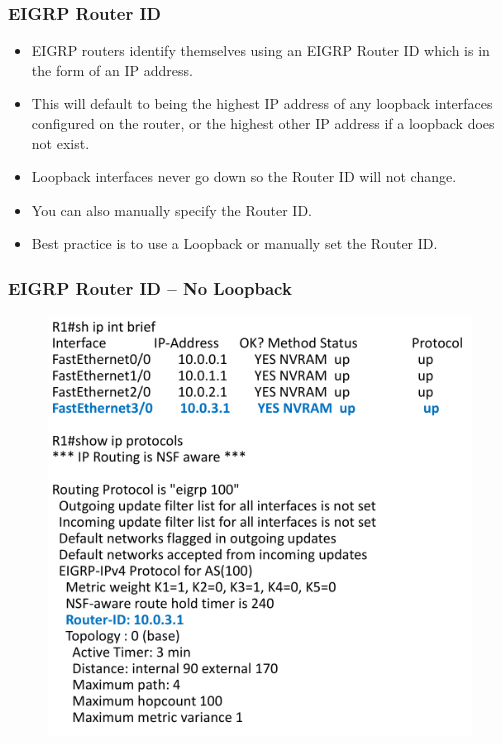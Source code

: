 \documentclass[pdflatex,compress,mathserif]{beamer}
\begin{document}
\begin{frame}
	\frametitle{EIGRP Router ID}
	\begin{itemize}
		\item EIGRP routers identify themselves using an EIGRP Router ID which is in
the form of an IP address.
		\item This will default to being the highest IP address of any loopback
interfaces configured on the router, or the highest other IP address if a
loopback does not exist.
		\item Loopback interfaces never go down so the Router ID will not change.
		\item You can also manually specify the Router ID.
		\item Best practice is to use a Loopback or manually set the Router ID.
	\end{itemize}
\end{frame}

\begin{frame}
	\frametitle{EIGRP Router ID – No Loopback}
	\begin{figure}
		\centering
		\includegraphics[width=0.6\linewidth]{img/img20}
	\end{figure}
\end{frame}
\end{document}
